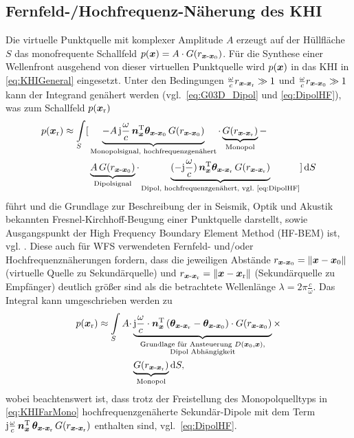 \subsection{Fernfeld-/Hochfrequenz-Näherung des KHI}
%
Die virtuelle Punktquelle mit komplexer Amplitude $A$ erzeugt auf der Hüllfläche $S$
das monofrequente Schallfeld
$p(\bm{x}) = A \cdot G(r_{\bm{x}\text{-}\bm{x}_\mathrm{0}})$.
%
Für die Synthese einer Wellenfront ausgehend von dieser virtuellen Punktquelle
wird $p(\bm{x})$ in das KHI in \Glg\eqref{eq:KHIGeneral} eingesetzt.
%
Unter den Bedingungen
$\frac{\omega}{c} r_{\bm{x}\text{-}\bm{x}_\mathrm{r}} \gg 1$ und
$\frac{\omega}{c} r_{\bm{x}\text{-}\bm{x}_\mathrm{0}} \gg 1$
kann der Integrand genähert werden (vgl.~\Glg\eqref{eq:G03D_Dipol} und
\eqref{eq:DipolHF}), was zum Schallfeld $p(\bm{x}_\mathrm{r})$
%
\begin{align}
p(\xr) \approx \int\limits_S [
&\underbrace{-A\,
\im\wc\,
\nxT \bm{\theta}_{\xs\text{-}\xp}\,
G(r_{\xs\text{-}\xp})}_{\text{Monopolsignal, hochfrequenzgenähert}}
%
\cdot \underbrace{G(r_{\xs\text{-}\xr})}_{\text{Monopol}}-
\nonumber\\
&\underbrace{A \, G(r_{\xs\text{-}\xp})}_{\text{Dipolsignal}}
\cdot
\underbrace{(-\im\wc)\,
\nxT \bm{\theta}_{\xs\text{-}\xr}\,
G(r_{\xs\text{-}\xr})}_{\text{Dipol, hochfrequenzgenähert, vgl.~\eqref{eq:DipolHF}}}
%
]\,\mathrm{d}S
\end{align}
%
führt und die Grundlage zur Beschreibung
der in Seismik, Optik und Akustik bekannten Fresnel-Kirchhoff-Beugung einer
Punktquelle darstellt, sowie Ausgangspunkt der
High Frequency Boundary Element Method
(HF-BEM) ist, vgl. \cite{Schultz2016_diss, Zotter2013, Firtha2019_diss}.
%
Diese auch für WFS verwendeten Fernfeld- und/oder
Hochfrequenznäherungen
fordern, dass die jeweiligen Abstände
$r_{\bm{x}\text{-}\bm{x}_\mathrm{0}}=\|\bm{x}-\bm{x}_\mathrm{0}\|$ (virtuelle Quelle zu Sekundärquelle) und
$r_{\bm{x}\text{-}\bm{x}_\mathrm{r}}=\|\bm{x}-\bm{x}_\mathrm{r}\|$ (Sekundärquelle zu Empfänger)
%
deutlich größer sind als die betrachtete Wellenlänge
$\lambda = 2\pi\frac{c}{\omega}$.
%
Das Integral kann umgeschrieben werden zu
%
\begin{align}
\label{eq:KHIFarMono}
p(\xr) \approx \int\limits_S A \cdot
&\underbrace{\im\wc \cdot \nxT\left(\bm{\theta}_{\xs\text{-}\xr} - \bm{\theta}_{\xs\text{-}\xp}\right)
\cdot G(r_{\xs\text{-}\xp})}_{\substack{\text{Grundlage für Ansteuerung } D(\xp,\xs) \text{,} \\ \text{Dipol Abhängigkeit}}}
\times\nonumber\\
&\underbrace{G(r_{\xs\text{-}\xr})}_{\text{Monopol}}
\mathrm{d}S,
\end{align}
%
%
wobei beachtenswert ist, dass trotz der Freistellung des
Monopolquelltyps in \Glg\eqref{eq:KHIFarMono} hochfrequenzgenäherte
Sekundär-Dipole mit dem Term $\im\wc\,\nxT\,\bm{\theta}_{\xs\text{-}\xr}\,
G(r_{\xs\text{-}\xr})$ enthalten sind, vgl.~\eqref{eq:DipolHF}.



